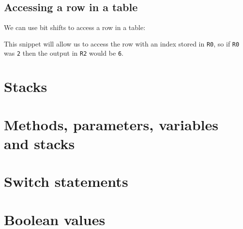 \documentclass{article}
\begin{document}
\subsection{Accessing a row in a table}

We can use bit shifts to access a row in a table:


This snippet will allow us to access the row with an index stored in {\tt R0},
so if {\tt R0} was {\tt 2} then the output in {\tt R2} would be {\tt 6}.

\section{Stacks}
\section{Methods, parameters, variables and stacks}
\section{Switch statements}
\section{Boolean values}
\end{document}
